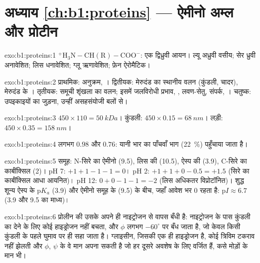 \section*{अध्याय \ref{ch:b1:proteins} --- ऐमीनो अम्ल और प्रोटीन}

\begin{solution}{exo:b1:proteins:1}
$\mathrm{^+H_3N{-}CH(R){-}COO^-}$: एक द्विध्रुवी आयन। ल्यू अध्रुवी
वसीय; सेर ध्रुवी अनावेशित; लिस धनावेशित; ग्लू ऋणावेशित;
फ़ेन ऐरोमैटिक।
\end{solution}

\begin{solution}{exo:b1:proteins:2}
प्राथमिक: अनुक्रम, । द्वितीयक: मेरुदंड का स्थानीय
वलन (कुंडली, चादर), मेरुदंड के । तृतीयक: समूची
शृंखला का वलन; इसमें जलविरोधी प्रभाव, , लवण-सेतु,  संपर्क, । चतुष्क: उपइकाइयों का जुड़ना,
उन्हीं असहसंयोजी बलों से।
\end{solution}

\begin{solution}{exo:b1:proteins:3}
$450\times 110 = \qty{50}{kDa}$। कुंडली: $450\times 0.15 = \qty{68}{nm}$।
लड़ी: $450\times 0.35 = \qty{158}{nm}$।
\end{solution}

\begin{solution}{exo:b1:proteins:4}
लगभग $0.98$ और $0.76$: यानी भार का पाँचवाँ भाग (\qty{22}{\%})
पहुँचाया जाता है।
\end{solution}

\begin{solution}{exo:b1:proteins:5}
समूह: N-सिरे का ऐमीनो (9.5), लिस की  (10.5), ऐस्प की
 (3.9), C-सिरे का कार्बॉक्सिल (2)। pH 7: $+1 + 1 - 1 - 1 = 0$।
pH 2: $+1 + 1 + 0 - 0.5 = +1.5$ (सिरे का कार्बॉक्सिल आधा आयनित)। pH
12: $0 + 0 - 1 - 1 = -2$ (लिस अधिकतर विप्रोटॉनित)। शुद्ध शून्य ऐस्प के
p$K_a$ (3.9) और ऐमीनो समूह के (9.5) के बीच, जहाँ आवेश भर
$0$ रहता है: p$I \approx 6.7$ (3.9 और 9.5 का माध्य)।
\end{solution}

\begin{solution}{exo:b1:proteins:6}
प्रोलीन की  उसके अपने ही नाइट्रोजन से वापस बँधी है:
नाइट्रोजन के पास कुंडली का  देने के लिए कोई हाइड्रोजन नहीं
बचता, और $\phi$ लगभग $-60^\circ$ पर बँध जाता है, जो केवल किसी कुंडली के
पहले घुमाव पर ही सहा जाता है। ग्लाइसीन, जिसकी  एक ही
हाइड्रोजन है, कोई त्रिविम टकराव नहीं झेलती और $\phi$, $\psi$ के वे मान
अपना सकती है जो हर दूसरे अवशेष के लिए वर्जित हैं, कसे मोड़ों के मान भी।
\end{solution}

